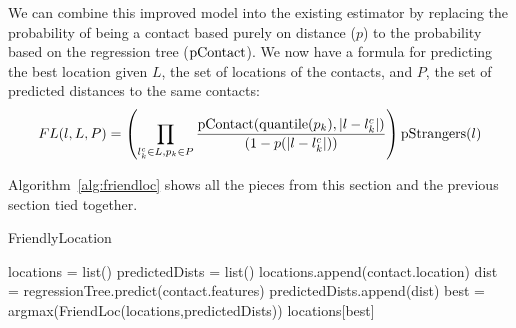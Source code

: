 We can combine this improved model into the existing estimator by
replacing the probability of being a contact based purely on distance ($p$) to
the probability based on the regression tree ($\operatorname{pContact}$).
%
We now have a formula for predicting the best location given $L$, the set of
locations of the contacts, and $P$, the set of predicted distances to the same
contacts:
\[
    FL(l,L,P) =
        \left(
            \prod_{l^c_k \in L,p_k \in P}
            {\operatorname{pContact}(\operatorname{quantile}(p_k),|l-l^c_k|) \over (1-p(|l-l^c_k|))}
        \right)
        \operatorname{pStrangers}(l)
\]


Algorithm~\ref{alg:friendloc} shows all the pieces from this section and the
previous section tied together.

\begin{algorithm}
  \caption{FriendlyLocation \label{alg:friendloc}}
  \begin{algorithmic}[0]
  \State locations = list()
  \State predictedDists = list()
        \State \Continue
      \EndIf
      \State locations.append(contact.location)
      \State dist = regressionTree.predict(contact.features)
      \State predictedDists.append(dist)
  \EndFor
  \State best = argmax(FriendLoc(locations,predictedDists))
  \State \Return locations[best]
  \end{algorithmic}
\end{algorithm}



